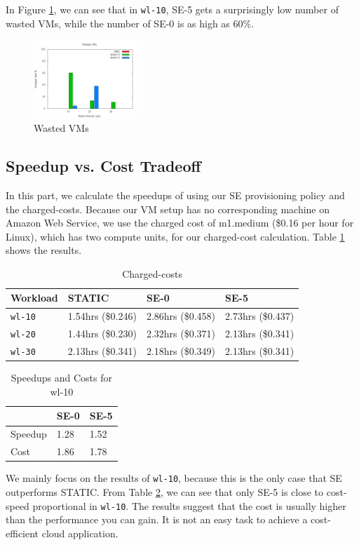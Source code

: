 In Figure \ref{figure_vm_wasted}, we can see that in \texttt{wl-10},
SE-5 gets a surprisingly low number of wasted VMs, while the number of
SE-0 is as high as 60\%.

\begin{figure}[!t]
\centering
\includegraphics[width=0.35\textwidth]{pictures/vm-wasted.png}
\caption{Wasted VMs}
\label{figure_vm_wasted}
\end{figure}


\subsection{Speedup vs. Cost Tradeoff}
In this part, we calculate the speedups of using our SE provisioning
policy and the charged-costs. Because our VM setup has no
corresponding machine on Amazon Web Service, we use the charged cost
of m1.medium (\$0.16 per hour for Linux), which has two compute units,
for our charged-cost calculation. Table \ref{table_chargedcosts} shows
the results.

\begin{table}
\caption{Charged-costs}
\label{table_chargedcosts}
\centering
\begin{tabular}{|l|l|l|l|}
\hline
Workload & STATIC & SE-0 & SE-5 \\
\hline
\texttt{wl-10} & 1.54hrs (\$0.246) & 2.86hrs (\$0.458) & 2.73hrs (\$0.437) \\
\hline
\texttt{wl-20} & 1.44hrs (\$0.230) & 2.32hrs (\$0.371) & 2.13hrs (\$0.341) \\
\hline
\texttt{wl-30} & 2.13hrs (\$0.341) & 2.18hrs (\$0.349) & 2.13hrs (\$0.341) \\
\hline
\end{tabular}
\end{table}

\begin{table}
\caption{Speedups and Costs for wl-10}
\label{table_speedupcost}
\centering
\begin{tabular}{|l|l|l|}
\hline
 & SE-0 & SE-5 \\
\hline
Speedup & 1.28 & 1.52 \\
\hline
Cost & 1.86 & 1.78 \\
\hline
\end{tabular}
\end{table}

We mainly focus on the results of \texttt{wl-10}, because this is the
only case that SE outperforms STATIC. From Table
\ref{table_speedupcost}, we can see that only SE-5 is close to
cost-speed proportional in \texttt{wl-10}. The results suggest that
the cost is usually higher than the performance you can gain. It is
not an easy task to achieve a cost-efficient cloud application.
